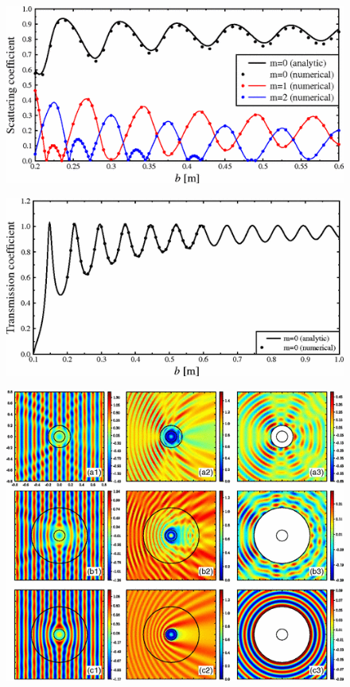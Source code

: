 \documentclass[12pt]{article}
\begin{document}
\begin{figure}[p]
  \centering
  \includegraphics[height=0.12\paperheight]{1.png}
  \caption{}
  \label{pikcha-1}
\end{figure}
\begin{figure}[p]
  \centering
  \includegraphics[height=0.12\paperheight]{2.png}
  \caption{}
  \label{pikcha-2}
\end{figure}
\begin{figure}[p]
  \centering
  \includegraphics[height=0.3\paperheight]{3.png}
  \caption{}
  \label{pikcha-3}
\end{figure}
\end{document}
